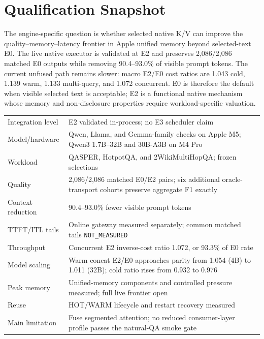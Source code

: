 \documentclass[10pt]{article}
\begin{document}
\section{Qualification Snapshot}

The engine-specific question is whether selected native K/V can improve the
quality--memory--latency frontier in Apple unified memory beyond selected-text
E0. The live native executor is validated at E2 and preserves 2,086/2,086
matched E0 outputs while removing 90.4--93.0\% of visible prompt tokens. The
current unfused path remains slower: macro E2/E0 cost ratios are 1.043 cold,
1.139 warm, 1.133 multi-query, and 1.072 concurrent. E0 is therefore the default
when visible selected text is acceptable; E2 is a functional native mechanism
whose memory and non-disclosure properties require workload-specific valuation.

\begin{center}
\small
\begin{tabularx}{0.96\linewidth}{lX}
\toprule
Integration level & E2 validated in-process; no E3 scheduler claim\\
Model/hardware & Qwen, Llama, and Gemma-family checks on Apple M5; Qwen3 1.7B--32B and 30B-A3B on M4 Pro\\
Workload & QASPER, HotpotQA, and 2WikiMultiHopQA; frozen selections\\
Quality & 2,086/2,086 matched E0/E2 pairs; six additional oracle-transport cohorts preserve aggregate F1 exactly\\
Context reduction & 90.4--93.0\% fewer visible prompt tokens\\
TTFT/ITL tails & Online gateway measured separately; common matched tails \texttt{NOT\_MEASURED}\\
Throughput & Concurrent E2 inverse-cost ratio 1.072, or 93.3\% of E0 rate\\
Model scaling & Warm concat E2/E0 approaches parity from 1.054 (4B) to 1.011 (32B); cold ratio rises from 0.932 to 0.976\\
Peak memory & Unified-memory components and controlled pressure measured; full live frontier open\\
Reuse & HOT/WARM lifecycle and restart recovery measured\\
Main limitation & Fuse segmented attention; no reduced consumer-layer profile passes the natural-QA smoke gate\\
\bottomrule
\end{tabularx}
\end{center}
\end{document}
